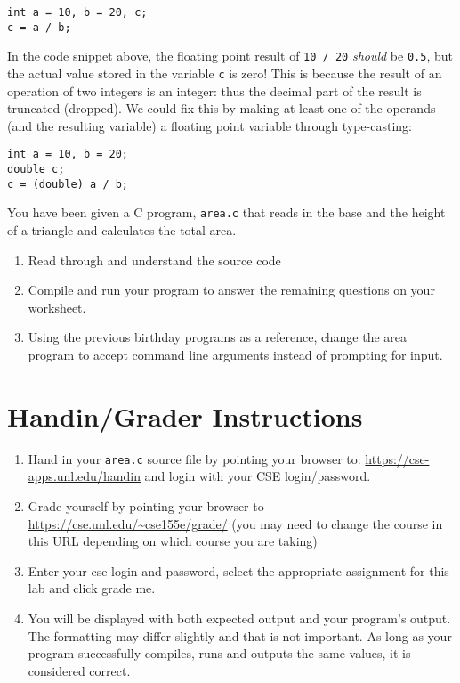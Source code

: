 \documentclass[12pt]{scrartcl}
\begin{document}
\begin{verbatim}
int a = 10, b = 20, c;
c = a / b;
\end{verbatim}

In the code snippet above, the floating point result of \texttt{10 / 20}
\emph{should} be \texttt{0.5}, but the actual value stored in the
variable \texttt{c} is zero!  This is because the result of an operation
of two integers is an integer: thus the decimal part of the result is truncated
(dropped).  We could fix this by making at least one of the operands (and
the resulting variable) a floating point variable through type-casting:

\begin{verbatim}
int a = 10, b = 20;
double c;
c = (double) a / b;
\end{verbatim}

You have been given a C program, \texttt{area.c} that reads
in the base and the height of a triangle and calculates the total area.

\begin{enumerate}
  \item Read through and understand the source code
  \item Compile and run your program to answer the remaining questions
  	on your worksheet.
  \item Using the previous birthday programs as a reference, change the
  	area program to accept command line arguments instead of prompting
	for input.
\end{enumerate}

\section{Handin/Grader Instructions}

\begin{enumerate}
  \item Hand in your \texttt{area.c} source file by pointing your browser to:
  	\url{https://cse-apps.unl.edu/handin} and login with your CSE
	login/password.
  \item Grade yourself by pointing your browser to
  	\url{https://cse.unl.edu/~cse155e/grade/} (you may need to change the course
	in this URL depending on which course you are taking)
  \item Enter your cse login and password, select the appropriate assignment for
  	this lab and click grade me.
  \item You will be displayed with both expected output and your program's output.
	The formatting may differ slightly and that is not important.  As long as your
	program successfully compiles, runs and outputs the same values, it is considered
	correct.
\end{enumerate}
\end{document}
